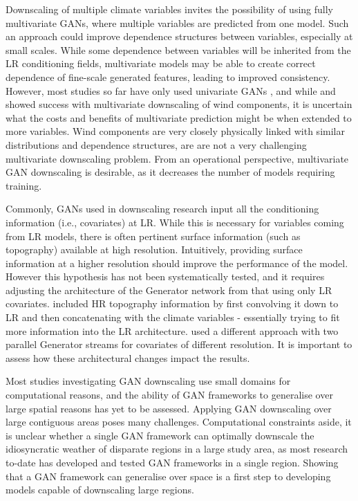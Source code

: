 \documentclass{ametsocV6.1}
\begin{document}
Downscaling of multiple climate variables invites the possibility of using fully multivariate GANs, where multiple variables are predicted from one model. Such an approach could improve dependence structures between variables, especially at small scales. While some dependence between variables will be inherited from the LR conditioning fields, multivariate models may be able to create correct dependence of fine-scale generated features, leading to improved consistency. However, most studies so far have only used univariate GANs \citep{harris2022generative,leinonen2020stochastic,price2022increasing}, and while \citet{annau2023algorithmic} and \citet{daust2024capturing} showed success with multivariate downscaling of wind components, it is uncertain what the costs and benefits of multivariate prediction might be when extended to more variables. Wind components are very closely physically linked with similar distributions and dependence structures, are are not a very challenging multivariate downscaling problem. From an operational perspective, multivariate GAN downscaling is desirable, as it decreases the number of models requiring training. 

Commonly, GANs used in downscaling research input all the conditioning information (i.e., covariates) at LR. While this is necessary for variables coming from LR models, there is often pertinent surface information (such as topography) available at high resolution. Intuitively, providing surface information at a higher resolution should improve the performance of the model. However this hypothesis has not been systematically tested, and it requires adjusting the architecture of the Generator network from that using only LR covariates. \citet{harris2022generative} included HR topography information by first convolving it down to LR and then concatenating with the climate variables - essentially trying to fit more information into the LR architecture. \citet{daust2024capturing} used a different approach with two parallel Generator streams for covariates of different resolution. It is important to assess how these architectural changes impact the results.

Most studies investigating GAN downscaling use small domains for computational reasons, and the ability of GAN frameworks to generalise over large spatial reasons has yet to be assessed. Applying GAN downscaling over large contiguous areas poses many challenges. Computational constraints aside, it is unclear whether a single GAN framework can optimally downscale the idiosyncratic weather of disparate regions in a large study area, as most research to-date has developed and tested GAN frameworks in a single region. Showing that a GAN framework can generalise over space is a first step to developing models capable of downscaling large regions.
\end{document}
